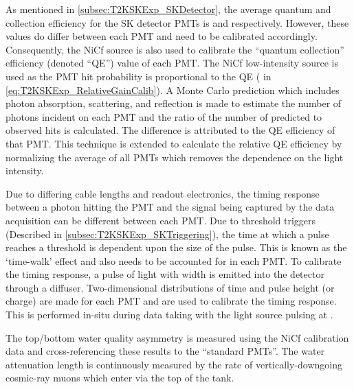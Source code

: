 As mentioned in \autoref{subsec:T2KSKExp_SKDetector}, the average quantum and collection efficiency for the SK detector PMTs is  and  respectively. However, these values do differ between each PMT and need to be calibrated accordingly. Consequently, the NiCf source is also used to calibrate the ``quantum \quickmath{\times} collection'' efficiency (denoted ``QE'') value of each PMT.
The NiCf low-intensity source is used as the PMT hit probability is proportional to the QE ( in \autoref{eq:T2KSKExp_RelativeGainCalib}). A Monte Carlo prediction which includes photon absorption, scattering, and reflection is made to estimate the number of photons incident on each PMT and the ratio of the number of predicted to observed hits is calculated. The difference is attributed to the QE efficiency of that PMT. This technique is extended to calculate the relative QE efficiency by normalizing the average of all PMTs which removes the dependence on the light intensity.

Due to differing cable lengths and readout electronics, the timing response between a photon hitting the PMT and the signal being captured by the data acquisition can be different between each PMT. Due to threshold triggers (Described in \autoref{subsec:T2KSKExp_SKTriggering}), the time at which a pulse reaches a threshold is dependent upon the size of the pulse. This is known as the `time-walk' effect and also needs to be accounted for in each PMT. To calibrate the timing response, a pulse of light with width  is emitted into the detector through a diffuser. Two-dimensional distributions of time and pulse height (or charge) are made for each PMT and are used to calibrate the timing response. This is performed in-situ during data taking with the light source pulsing at .

The top/bottom water quality asymmetry is measured using the NiCf calibration data and cross-referencing these results to the ``standard PMTs''. The water attenuation length is continuously measured by the rate of vertically-downgoing cosmic-ray muons which enter via the top of the tank.

